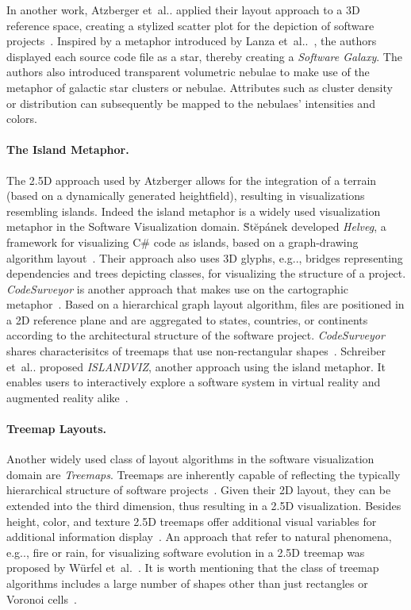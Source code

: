 \documentclass[runningheads]{llncs}
\makeatletter
\DeclareRobustCommand\onedot{\futurelet\@let@token\@onedot}
\def\@onedot{\ifx\@let@token.\else.\null\fi\xspace}
\def\etal{et~al\onedot}
\def\eg{e.g\onedot,\xspace}
\makeatother
\begin{document}
In another work, Atzberger \etal applied their layout approach to a 3D reference space, creating a stylized scatter plot for the depiction of software projects~\cite{atzberger2021-softwaregalaxy}.
Inspired by a metaphor introduced by Lanza \etal~\cite{lanza2001evolutionmatrix}, the authors displayed each source code file as a star, thereby creating a \emph{Software Galaxy}.
The authors also introduced transparent volumetric nebulae to make use of the metaphor of galactic star clusters or nebulae.
Attributes such as cluster density or distribution can subsequently be mapped to the nebulaes' intensities and colors.

\paragraph{The Island Metaphor.} 
The 2.5D approach used by Atzberger allows for the integration of a terrain (based on a dynamically generated heightfield), resulting in visualizations resembling islands.
Indeed the island metaphor is a widely used visualization metaphor in the Software Visualization domain.
\u{S}t\u{e}p\'{a}nek developed \textit{Helveg}, a framework for visualizing C\# code as islands, based on a graph-drawing algorithm layout~\cite{stepanek2020-landscapesthesis}.
Their approach also uses 3D glyphs, \eg bridges representing dependencies and trees depicting classes, for visualizing the structure of a project.
\emph{CodeSurveyor} is another approach that makes use on the cartographic metaphor~\cite{hawes2015-codesurveyor}.
Based on a hierarchical graph layout algorithm, files are positioned in a 2D reference plane and are aggregated to states, countries, or continents according to the architectural structure of the software project.
\emph{CodeSurveyor} shares characterisitcs of treemaps that use non-rectangular shapes~\cite{scheibel2020-treemap-layout-algorithms}.
Schreiber \etal proposed \emph{ISLANDVIZ}, another approach using the island metaphor.
It enables users to interactively explore a software system in virtual reality and augmented reality alike~\cite{schreiber2018-islandmetaphor}.

\paragraph{Treemap Layouts.}
Another widely used class of layout algorithms in the software visualization domain are \emph{Treemaps}.
Treemaps are inherently capable of reflecting the typically hierarchical structure of software projects~\cite{scheibel2020-treemaptaxonomy,scheibel2020-treemap-layout-algorithms}.
Given their 2D layout, they can be extended into the third dimension, thus resulting in a 2.5D visualization.
Besides height, color, and texture 2.5D treemaps offer additional visual variables for additional information display~\cite{limberger2019-softwaremap,limberger2021-procedural,limberger2020-uncertainty}.
An approach that refer to natural phenomena, \eg fire or rain, for visualizing software evolution in a 2.5D treemap was proposed by W{\"u}rfel et~al.~\cite{wurfel2015natural}.
It is worth mentioning that the class of treemap algorithms includes a large number of shapes other than just rectangles or Voronoi cells~\cite{scheibel2020-treemaptaxonomy}.
\end{document}
